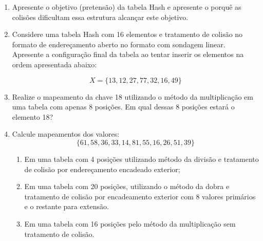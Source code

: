 \documentclass[12pt]{article}
\begin{document}
\begin{enumerate}[resume,label=\textbf{Q\arabic*}]
    \item Apresente o objetivo (pretensão) da tabela Hash e apresente o porquê as colisões dificultam essa estrutura alcançar este objetivo.
    \item Considere uma tabela Hash com 16 elementos e tratamento de colisão no formato de endereçamento aberto no formato com sondagem linear. Apresente a configuração final da           tabela ao tentar inserir os elementos na ordem apresentada abaixo:

          $$X = \{13, 12, 27, 77, 32, 16,49\}$$

    \item Realize o mapeamento da chave 18 utilizando o método da multiplicação em uma tabela com apenas 8 posições. Em qual dessas 8 posições estará o elemento 18?

    \item Calcule mapeamentos dos valores:
          $$\{61,58,36,33,14,81,55,16,26,51,39\}$$
          \begin{enumerate}
              \item Em uma tabela com 4 posições utilizando método da divisão e tratamento de colisão por endereçamento encadeado exterior;
              \item Em uma tabela com 20 posições, utilizando o método da dobra e tratamento de colisão por encadeamento exterior com 8 valores primários e o restante para extensão.
              \item Em uma tabela com 16 posições pelo método da multiplicação sem tratamento de colisão.
          \end{enumerate}
\end{enumerate}
\end{document}
